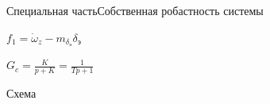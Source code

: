  

\begin{frame}{Специальная часть}{Собственная робастность системы}
    \begin{minipage}[c]{0.45\textwidth}
        \begin{center}
        $f_1 = \dot{\omega}_z - m_{\delta_\text{э}}\delta_\text{э}$
        \end{center}
    \end{minipage}
    \begin{minipage}[c]{0.45\textwidth}
        \begin{center}
        $G_c = \frac{K}{p+K} = \frac{1}{Tp+1}$
        \end{center}
    \end{minipage}
    \begin{block}{Схема}
    \end{block}
\end{frame}

